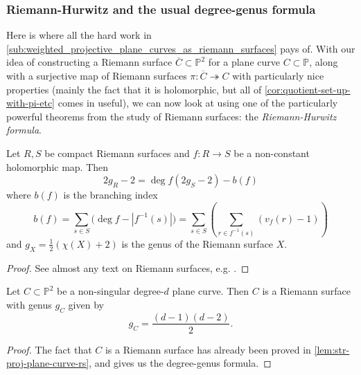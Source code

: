 \documentclass[10pt,notitlepage]{article}
\numberwithin{equation}{subsection}
\newcommand{\pee}{\mathbb{P}}
\newcommand{\cover}[1]{\overline{#1}}
\begin{document}
        \subsubsection{Riemann-Hurwitz and the usual degree-genus formula} %
        \label{ssub:riemann_hurwitz_and_the_usual_degree_genus_formula}

            Here is where all the hard work in \cref{sub:weighted_projective_plane_curves_as_riemann_surfaces} pays of.
            With our idea of constructing a Riemann surface $\cover{C}\subset\pee^2$ for a plane curve $C\subset\pee$, along with a surjective map of Riemann surfaces $\pi\colon\cover{C}\twoheadrightarrow C$ with particularly nice properties (mainly the fact that it is holomorphic, but all of \cref{cor:quotient-set-up-with-pi-etc} comes in useful), we can now look at using one of the particularly powerful theorems from the study of Riemann surfaces: the \emph{Riemann-Hurwitz formula}.

            \begin{theorem}\label{thm:rh-formula}
                Let $R,S$ be compact Riemann surfaces and $f\colon R\to S$ be a non-constant holomorphic map.
                Then
                \[
                    2g_R-2=\deg f(2g_S-2)-b(f)
                \]
                where $b(f)$ is the branching index
                \[
                    b(f) = \sum_{s\in S}\big(\deg f - |f^{-1}(s)|\big) = \sum_{s\in S}\left(\sum_{r\in f^{-1}(s)}(v_f(r)-1)\right)
                \]
                and $g_X=\frac12(\chi(X)+2)$ is the genus of the Riemann surface $X$.
            \end{theorem}

            \begin{proof}
                See almost any text on Riemann surfaces, e.g. \cite[Chapter~II,~Theorem~4.16]{Miranda:1995uz}.
            \end{proof}

            \begin{theorem}\label{thm:straight-dg}
                Let $C\subset\pee^2$ be a non-singular degree-$d$ plane curve.
                Then $C$ is a Riemann surface with genus $g_C$ given by
                \[
                    g_C = \frac{(d-1)(d-2)}{2}.
                \]
            \end{theorem}

            \begin{proof}
                The fact that $C$ is a Riemann surface has already been proved in \cref{lem:str-proj-plane-curve-rs}, and \cite[Corollary~4.19]{Kirwan:1992wj} gives us the degree-genus formula.
            \end{proof}
\end{document}

